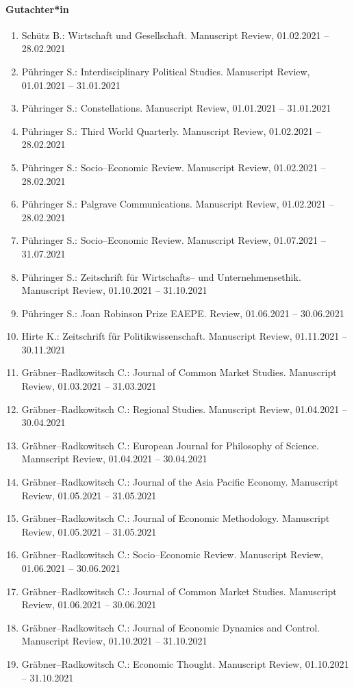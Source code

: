 \paragraph{Gutachter*in}
\begin{enumerate}[leftmargin=*, labelsep=0.5cm]
\item Schütz B.: Wirtschaft und Gesellschaft. Manuscript Review, 01.02.2021 -- 28.02.2021
\item Pühringer S.: Interdisciplinary Political Studies. Manuscript Review, 01.01.2021 -- 31.01.2021
\item Pühringer S.: Constellations. Manuscript Review, 01.01.2021 -- 31.01.2021
\item Pühringer S.: Third World Quarterly. Manuscript Review, 01.02.2021 -- 28.02.2021
\item Pühringer S.: Socio--Economic Review. Manuscript Review, 01.02.2021 -- 28.02.2021
\item Pühringer S.: Palgrave Communications. Manuscript Review, 01.02.2021 -- 28.02.2021
\item Pühringer S.: Socio--Economic Review. Manuscript Review, 01.07.2021 -- 31.07.2021
\item Pühringer S.: Zeitschrift für Wirtschafts-- und Unternehmensethik. Manuscript Review, 01.10.2021 -- 31.10.2021
\item Pühringer S.: Joan Robinson Prize EAEPE. Review, 01.06.2021 -- 30.06.2021
\item Hirte K.: Zeitschrift für Politikwissenschaft. Manuscript Review, 01.11.2021 -- 30.11.2021
\item Gräbner--Radkowitsch C.: Journal of Common Market Studies. Manuscript Review, 01.03.2021 -- 31.03.2021
\item Gräbner--Radkowitsch C.: Regional Studies. Manuscript Review, 01.04.2021 -- 30.04.2021
\item Gräbner--Radkowitsch C.: European Journal for Philosophy of Science. Manuscript Review, 01.04.2021 -- 30.04.2021
\item Gräbner--Radkowitsch C.: Journal of the Asia Pacific Economy. Manuscript Review, 01.05.2021 -- 31.05.2021
\item Gräbner--Radkowitsch C.: Journal of Economic Methodology. Manuscript Review, 01.05.2021 -- 31.05.2021
\item Gräbner--Radkowitsch C.: Socio--Economic Review. Manuscript Review, 01.06.2021 -- 30.06.2021
\item Gräbner--Radkowitsch C.: Journal of Common Market Studies. Manuscript Review, 01.06.2021 -- 30.06.2021
\item Gräbner--Radkowitsch C.: Journal of Economic Dynamics and Control. Manuscript Review, 01.10.2021 -- 31.10.2021
\item Gräbner--Radkowitsch C.: Economic Thought. Manuscript Review, 01.10.2021 -- 31.10.2021
\end{enumerate}

